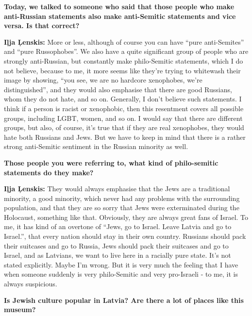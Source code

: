 \textbf{Today, we talked to someone who said that those people who make anti-Russian statements also make anti-Semitic statements and vice versa. Is that correct?}

\textbf{Iļja Ļenskis:} More or less, although of course you can have ``pure anti-Semites'' and ``pure Russophobes''. We also have a quite significant group of people who are strongly anti-Russian, but constantly make philo-Semitic statements, which I do not believe, because to me, it more seems like they’re trying to whitewash their image by showing, ``you see, we are no hardcore xenophobes, we’re distinguished'', and they would also emphasise that there are good Russians, whom they do not hate, and so on. Generally, I don’t believe such statements. I think if a person is racist or xenophobic, then this resentment covers all possible groups, including LGBT, women, and so on. I would say that there are different groups, but also, of course, it’s true that if they are real xenophobes, they would hate both Russians and Jews. But we have to keep in mind that there is a rather strong anti-Semitic sentiment in the Russian minority as well. 

\textbf{Those people you were referring to, what kind of philo-semitic statements do they make?} 

\textbf{Iļja Ļenskis:} They would always emphasise that the Jews are a traditional minority, a good minority, which never had any problems with the surrounding population, and that they are so sorry that Jews were exterminated during the Holocaust, something like that. Obviously, they are always great fans of Israel. To me, it has kind of an overtone of  ``Jews, go to Israel. Leave Latvia and go to Israel.'', that every nation should stay in their own country. Russians should pack their suitcases and go to Russia, Jews should pack their suitcases and go to Israel, and as Latvians, we want to live here in a racially pure state. It’s not stated explicitly. Maybe I’m wrong. But it is very much the feeling that I have when someone suddenly is very philo-Semitic and very pro-Israeli - to me, it is always suspicious. 

\textbf{Is Jewish culture popular in Latvia? Are there a lot of places like this museum?}

